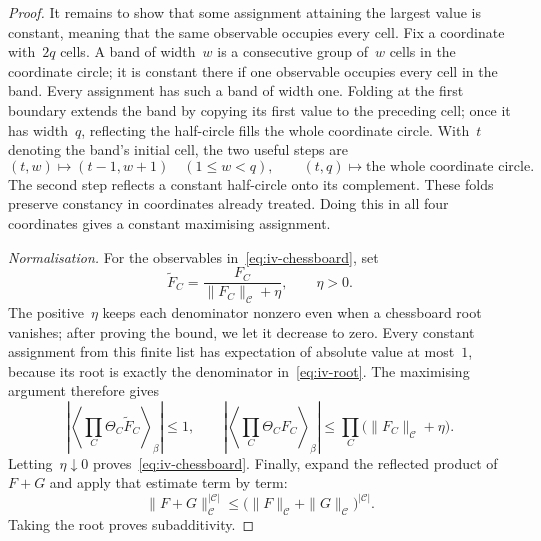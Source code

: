 \begin{proof}
It remains to show that some assignment attaining the largest value is constant, meaning that the same observable occupies every cell.
Fix a coordinate with~$2q$ cells. A band of width~$w$ is a consecutive group of~$w$ cells in the coordinate circle; it is constant there if one observable occupies every cell in the band.
Every assignment has such a band of width one.
Folding at the first boundary extends the band by copying its first value to the preceding cell; once it has width~$q$, reflecting the half-circle fills the whole coordinate circle.
With~$t$ denoting the band's initial cell, the two useful steps are
\begin{equation*}
 (t,w)\longmapsto(t-1,w+1)\quad(1\le w<q),
 \qquad (t,q)\longmapsto\text{the whole coordinate circle}.
\end{equation*}
The second step reflects a constant half-circle onto its complement.
These folds preserve constancy in coordinates already treated.
Doing this in all four coordinates gives a constant maximising assignment.

\emph{Normalisation.}
For the observables in~\eqref{eq:iv-chessboard}, set
\begin{equation*}
 \widetilde F_C=\frac{F_C}{\|F_C\|_{\mathcal C}+\eta},\qquad \eta>0.
\end{equation*}
The positive~$\eta$ keeps each denominator nonzero even when a chessboard root vanishes; after proving the bound, we let it decrease to zero.
Every constant assignment from this finite list has expectation of absolute value at most~$1$, because its root is exactly the denominator in~\eqref{eq:iv-root}.
The maximising argument therefore gives
\begin{equation*}
 \left|\left\langle\prod_C\Theta_C\widetilde F_C\right\rangle_\beta\right|\le1,
 \qquad
 \left|\left\langle\prod_C\Theta_C F_C\right\rangle_\beta\right|
 \le\prod_C\bigl(\|F_C\|_{\mathcal C}+\eta\bigr).
\end{equation*}
Letting~$\eta\downarrow0$ proves~\eqref{eq:iv-chessboard}.
Finally, expand the reflected product of~$F+G$ and apply that estimate term by term:
\begin{equation*}
 \|F+G\|_{\mathcal C}^{|\mathcal C|}
 \le\bigl(\|F\|_{\mathcal C}+\|G\|_{\mathcal C}\bigr)^{|\mathcal C|}.
\end{equation*}
Taking the root proves subadditivity.
\end{proof}


